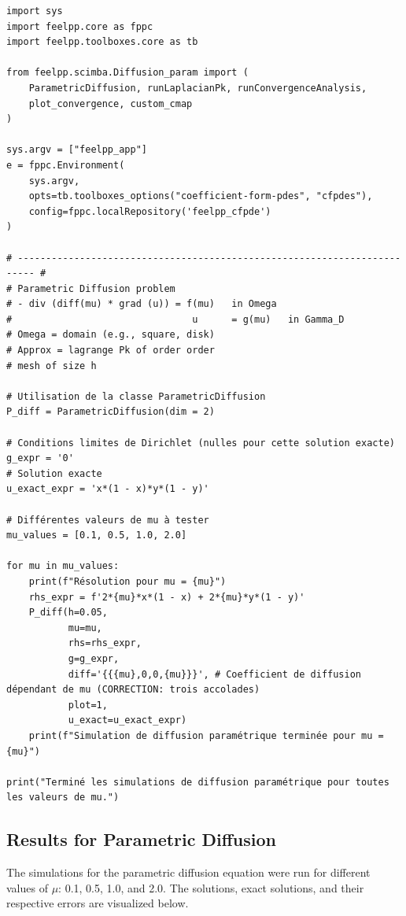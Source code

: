 \documentclass{article}
\begin{document}
\begin{verbatim}
import sys
import feelpp.core as fppc
import feelpp.toolboxes.core as tb

from feelpp.scimba.Diffusion_param import (
    ParametricDiffusion, runLaplacianPk, runConvergenceAnalysis,
    plot_convergence, custom_cmap
)

sys.argv = ["feelpp_app"]
e = fppc.Environment(
    sys.argv,
    opts=tb.toolboxes_options("coefficient-form-pdes", "cfpdes"),
    config=fppc.localRepository('feelpp_cfpde')
)

# ------------------------------------------------------------------------- #
# Parametric Diffusion problem
# - div (diff(mu) * grad (u)) = f(mu)   in Omega
#                                u      = g(mu)   in Gamma_D
# Omega = domain (e.g., square, disk)
# Approx = lagrange Pk of order order
# mesh of size h

# Utilisation de la classe ParametricDiffusion
P_diff = ParametricDiffusion(dim = 2)

# Conditions limites de Dirichlet (nulles pour cette solution exacte)
g_expr = '0'
# Solution exacte
u_exact_expr = 'x*(1 - x)*y*(1 - y)'

# Différentes valeurs de mu à tester
mu_values = [0.1, 0.5, 1.0, 2.0]

for mu in mu_values:
    print(f"Résolution pour mu = {mu}")
    rhs_expr = f'2*{mu}*x*(1 - x) + 2*{mu}*y*(1 - y)'
    P_diff(h=0.05,
           mu=mu,
           rhs=rhs_expr,
           g=g_expr,
           diff='{{{mu},0,0,{mu}}}', # Coefficient de diffusion dépendant de mu (CORRECTION: trois accolades)
           plot=1,
           u_exact=u_exact_expr)
    print(f"Simulation de diffusion paramétrique terminée pour mu = {mu}")

print("Terminé les simulations de diffusion paramétrique pour toutes les valeurs de mu.")
\end{verbatim}

\subsection{Results for Parametric Diffusion}

The simulations for the parametric diffusion equation were run for different values of $\mu$: 0.1, 0.5, 1.0, and 2.0. The solutions, exact solutions, and their respective errors are visualized below.
\end{document}
